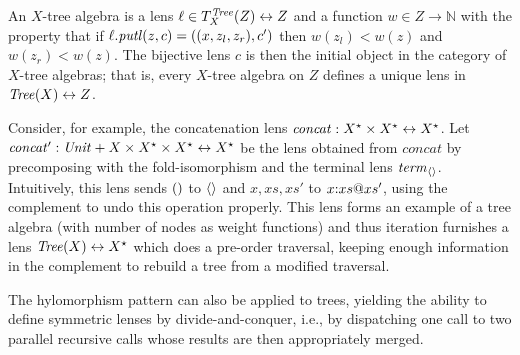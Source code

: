 \begin{defn}[$R$-similarity]
\begin{theorem}
\begin{lemma}
\begin{theorem}[No products]
\begin{lemma}
\begin{defn}
\begin{theorem}
\begin{theorem}
\begin{corollary}[Hylomorphism]
An $X$-tree algebra is a lens $\ell \in T^{\mathit{Tree}}_X(Z)\leftrightarrow Z$
and a function $w \in Z\rightarrow \mathbb{N}$ 
 with the property that if 
$\ell.\mathit{putl}(z,c) = ((x,z_l,z_r),c')$
 then $w(z_l) < w(z)$ and $w(z_r) < w(z)$. 
%
The bijective lens $c$ is then the initial object in the category of
$X$-tree algebras; that is, every $X$-tree algebra on $Z$ defines a unique
lens in $\mathit{Tree}(X)\leftrightarrow Z$.

Consider, for example, the concatenation lens
$\mathit{concat}:X^\star \times X^\star\leftrightarrow X^\star$. Let\label{concatprime}
$\mathit{concat'}:\mathit{Unit} + X \times X^\star \times X^\star \leftrightarrow
X^\star$ be the lens obtained from $\mathit{concat}$ by precomposing
with the fold-isomorphism and the terminal lens $\mathit{term}_{\left<\right>}$.
Intuitively, this lens sends ${()}$ to $\left<\right>$ and $x,xs,xs'$ to
$x \mathord{:} xs @ xs'$, using the complement to undo this operation
properly. This lens forms an example of a tree algebra (with number of
nodes as weight functions) and thus iteration furnishes a lens
$\mathit{Tree}(X)\leftrightarrow X^\star$ which does a pre-order traversal, keeping enough
information in the complement to rebuild a tree from a modified traversal.

The hylomorphism pattern can also be applied to trees,
yielding the ability to define symmetric lenses by
divide-and-conquer, i.e., by dispatching one call to two parallel
recursive calls whose results are then appropriately merged.







\end{corollary}
\end{theorem}
\end{theorem}
\end{defn}
\end{lemma}
\end{theorem}
\end{lemma}
\end{theorem}
\end{defn}
